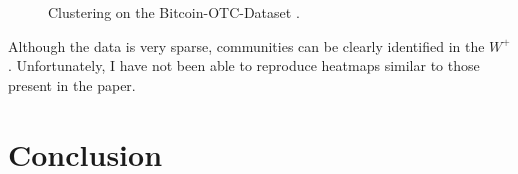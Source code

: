 \documentclass[11pt]{article}
\begin{document}
  \begin{figure}[h!]
    \centering
      \hfill
      \caption{\label{fig:bitcoinotcmap} Clustering on the Bitcoin-OTC-Dataset \cite{kumar2016edge}.}
  \end{figure}

  Although the data is very sparse, communities can be clearly identified in the $W^+$. Unfortunately,
  I have not been able to reproduce heatmaps similar to those present in the paper.

\section{Conclusion}
\end{document}
